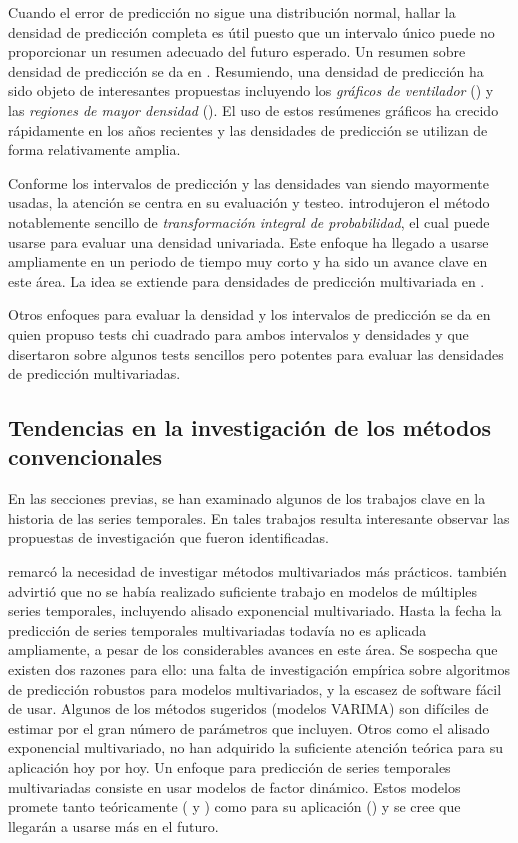 \documentclass{llncs}
\begin{document}
Cuando el error de predicción no sigue una distribución normal, hallar la densidad de predicción completa es útil puesto que un intervalo único puede no proporcionar un resumen adecuado del futuro esperado. Un resumen sobre densidad de predicción se da en  \cite{Tay2000235}. Resumiendo, una densidad de predicción ha sido objeto de interesantes propuestas incluyendo los \emph{gráficos de ventilador}  (\cite{Wallis1999106}) y las \emph{regiones de mayor densidad} (\cite{Hyndman1995431}). El uso de estos resúmenes gráficos ha crecido rápidamente en los años recientes y las densidades de predicción se utilizan de forma relativamente amplia.

Conforme los intervalos de predicción y las densidades van siendo mayormente usadas, la atención se centra en su evaluación y testeo. \cite{Diebold1998863} introdujeron el método notablemente sencillo de \emph{transformación integral de probabilidad}, el cual puede usarse para evaluar una densidad univariada. Este enfoque ha llegado a usarse ampliamente en un periodo de tiempo muy corto y ha sido un avance clave en este área. La idea se extiende para densidades de predicción multivariada en \cite{Diebold1999661}.

Otros enfoques para evaluar la densidad y los intervalos de predicción se da en \cite{Wallis2003165} quien propuso tests chi cuadrado para ambos intervalos y densidades y \cite{Clements2002397} que disertaron sobre algunos tests sencillos pero potentes para evaluar las densidades de predicción multivariadas.

\subsection{Tendencias en la investigación de los métodos convencionales}
En las secciones previas, se han examinado algunos de los trabajos clave en la historia de las series temporales. En tales trabajos resulta interesante observar las propuestas de investigación que fueron identificadas. 

\cite{Chatfield198819} remarcó la necesidad de investigar métodos multivariados más prácticos. \cite{Ord1988389} también advirtió que no se había realizado suficiente trabajo en modelos de múltiples series temporales, incluyendo alisado exponencial multivariado. Hasta la fecha la predicción de series temporales multivariadas todavía no es aplicada ampliamente, a pesar  de los considerables avances en este área. Se sospecha que existen dos razones para ello: una falta de investigación empírica sobre algoritmos de predicción robustos para modelos multivariados, y la escasez de software fácil de usar. Algunos de los métodos sugeridos (modelos VARIMA) son difíciles de estimar por el gran número de parámetros que incluyen. Otros como el alisado exponencial multivariado, no han adquirido la suficiente atención teórica para su aplicación hoy por hoy. Un enfoque para predicción de series temporales multivariadas consiste en usar modelos de factor dinámico. Estos modelos promete tanto teóricamente (\cite{Forni2005830} y \cite{Stock20021167}) como para su aplicación (\cite{Pena2004291}) y se cree que llegarán a usarse más en el futuro.
\end{document}
